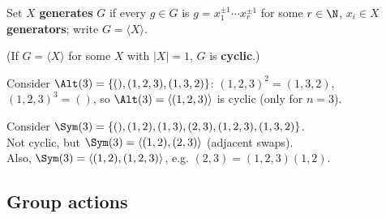 \begin{slide}
    \begin{definition}[generator]
        \vspace{0pt}
        Set $X$ \textbf{generates} $G$ if every $g \in G$ is $g = x_1^{\pm 1} \dotsb x_r^{\pm 1}$ for some $r \in \N$, $x_i \in X$ \textbf{generators}; write $G = \langle X \rangle$. \pause

        (If $G = \langle X \rangle$ for some $X$ with $|X| = 1$, $G$ is \textbf{cyclic}.)
    \end{definition} \pause

    \begin{example}
        \vspace{0pt}
        Consider $\Alt(3) = \{(),(1,2,3),(1,3,2)\}$: $(1,2,3)^2 = (1,3,2)$, $(1,2,3)^3 = ()$, so $\Alt(3) = \langle(1,2,3)\rangle$ is cyclic (only for $n = 3$).
    \end{example}

    \begin{example}
        \vspace{0pt}
        Consider $\Sym(3) = \{(),(1,2),(1,3),(2,3),(1,2,3),(1,3,2)\}$. \\
        Not cyclic, but $\Sym(3) = \langle(1,2),(2,3)\rangle$ (adjacent swaps). \\
        Also, $\Sym(3) = \langle(1,2),(1,2,3)\rangle$, e.g. $(2,3) = (1,2,3)(1,2)$.
    \end{example}
\end{slide}

\subsection{Group actions}

